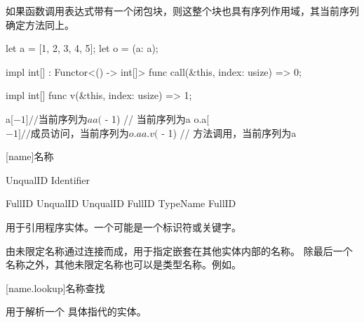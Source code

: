 \pnum
如果函数调用表达式带有一个闭包块，则这整个块也具有序列作用域，其当前序列确定方法同上。

\enterexample

\begin{codeblock}
let a = [1, 2, 3, 4, 5];
let o = (a: a);

impl int[] : Functor<() -> int[]> {
    func call(&this, index: usize) => 0;
}

impl int[] {
    func v(&this, index: usize) => 1;
}

a[$ - 1] // 当前序列为a
a($ - 1) // 当前序列为a
o.a[$ - 1] // 成员访问，当前序列为o.a
a.v($ - 1) // 方法调用，当前序列为a

\end{codeblock}

\exitexample

[name]{名称}

\begin{bnf}{UnqualID}
    Identifier \br
\end{bnf}

\begin{bnf}{FullID}
    UnqualID \br
    UnqualID \terminal{::} FullID \br
    TypeName \terminal{::} FullID
\end{bnf}

\pnum
{}用于引用程序实体。一个可能是一个标识符或关键字。

\pnum
{}由未限定名称通过\tcode{::}连接而成，用于指定嵌套在其他实体内部的名称。
除最后一个名称之外，其他未限定名称也可以是类型名称。\enterexample 例如。\exitexample

[name.lookup]{名称查找}

\pnum
{}用于解析一个  具体指代的实体。
